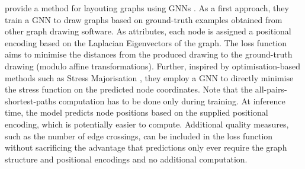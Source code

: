 \documentclass[
	fontsize=10pt, %
	twoside=false, %
	secnumdepth=1, %
]{kaobook}
\begin{document}
\citeauthor{tiezzi_GraphNeuralNetworks_2021} provide a method for layouting
graphs using GNNs
\cite{tiezzi_GraphNeuralNetworks_2021}
. As a first approach, they train a GNN to draw graphs based on
ground-truth examples obtained from other graph drawing software. As attributes,
each node is assigned a positional encoding based on the Laplacian Eigenvectors
of the graph. The loss function aims to minimise the distances from the produced
drawing to the ground-truth drawing (modulo affine transformations).
Further, inspired by optimisation-based methods such as Stress Majorisation
\cite{gansner_GraphDrawingStress_2005}, they employ a GNN to directly minimise
the stress function on the predicted node coordinates. Note that the
all-pairs-shortest-paths computation has to be done only during training. At
inference time, the model predicts node positions based on the supplied
positional encoding, which is potentially easier to compute. Additional quality
measures, such as the number of edge crossings, can be included in the loss
function without sacrificing the advantage that predictions only ever require
the graph structure and positional encodings and no additional computation.


\end{document}
